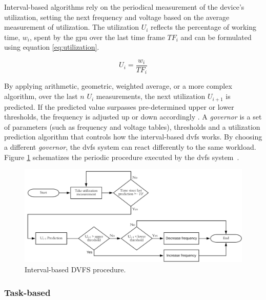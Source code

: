 Interval-based algorithms rely on the periodical measurement of the device's utilization, setting the next frequency and voltage based on the average measurement of utilization. The utilization $U_{i}$ reflects the percentage of working time, $w_{i}$, spent by the \acrshort{gpu} over the last time frame $TF_{i}$ and can be formulated using equation \ref{eq:utilization}.

\begin{equation}
    U_i=\frac{w_i}{TF_i}
    \label{eq:utilization}
\end{equation}

By applying arithmetic, geometric, weighted average, or a more complex algorithm, over the last $n$ $U_{i}$ measurements,  the next utilization $U_{i+1}$ is predicted. If the predicted value surpasses pre-determined upper or lower thresholds, the frequency is adjusted up or down accordingly \cite{seongki_gpgpu-perf:_2015}. 
A \textit{governor} is a set of parameters (such as frequency and voltage tables), thresholds and a utilization prediction algorithm that controls how the interval-based \acrshort{dvfs} works. By choosing a different \textit{governor}, the \acrshort{dvfs} system can react differently to the same workload. Figure \ref{fig:DVFSprocedure} schematizes the periodic procedure executed by the \acrshort{dvfs} system~\cite{seongki_gpgpu-perf:_2015}. 

\begin{figure}[htb]
  \centering
  \includegraphics[width=\textwidth]{Figures/Background/DVFSprogram.png}
  \caption{Interval-based DVFS procedure.}
  \label{fig:DVFSprocedure}
\end{figure}

\subsubsection{Task-based}

